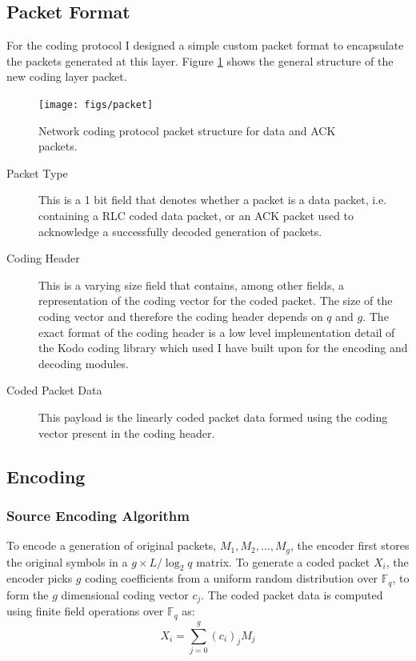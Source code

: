 \documentclass[12pt,a4paper,twoside,openright]{report}
\begin{document}
\subsection{Packet Format} \label{sec:pack}
For the coding protocol I designed a simple custom packet format to encapsulate the packets generated at this layer. Figure \ref{fig:packet} shows the general structure of the new coding layer packet.

\begin{figure}[tbh]
	\centerline{\texttt{[image: figs/packet]}}
	\caption{Network coding protocol packet structure for data and ACK packets.}
	\label{fig:packet}
\end{figure}

\begin{description}
	\item[Packet Type] This is a 1 bit field that denotes whether a packet is a data packet, i.e. containing a RLC coded data packet, or an ACK packet used to acknowledge a successfully decoded generation of packets.
	\item[Coding Header] This is a varying size field that contains, among other fields, a representation of the coding vector for the coded packet. The size of the coding vector and therefore the coding header depends on $q$ and $g$. The exact format of the coding header is a low level implementation detail of the Kodo coding library \cite{kodo} which used I have built upon for the encoding and decoding modules.
	\item[Coded Packet Data] This payload is the linearly coded packet data formed using the coding vector present in the coding header. 
\end{description}

\subsection{Encoding}

\subsubsection{Source Encoding Algorithm}
To encode a generation of original packets, $M_1, M_2, ..., M_g$, the encoder first stores the original symbols in a $g \times L / \log_2 q$ matrix. To generate a coded packet $X_i$, the encoder picks $g$ coding coefficients from a uniform random distribution over $\mathbb{F}_q$, to form the $g$ dimensional coding vector $c_j$. The coded packet data is computed using finite field operations over $\mathbb{F}_q$ as:
\begin{equation}
	X_i = \sum_{j = 0}^g (c_i)_j M_j
\end{equation}
\end{document}

